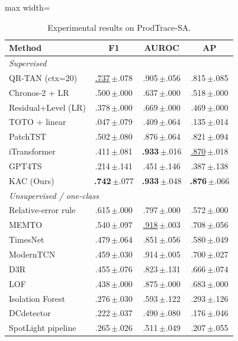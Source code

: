 \documentclass[conference]{IEEEtran}
\newcommand{\sd}[1]{\,{\fontsize{6pt}{7pt}\selectfont $\pm$#1}}
\begin{document}
\begin{table}[!htbp]
  \centering
  \caption{Experimental results on ProdTrace-SA.}
  \label{tab:production_benchmark}
  \small
  \setlength{\tabcolsep}{6pt}
  \begin{adjustbox}{max width=\columnwidth}
  \begin{tabular}{@{}lccc@{}}
    \toprule
    \textbf{Method} & \textbf{F1} & \textbf{AUROC} & \textbf{AP} \\
    \midrule
    \multicolumn{4}{l}{\emph{Supervised}} \\
    QR-TAN (ctx=20)                      & \underline{.737}\sd{.078} & .905\sd{.056} & .815\sd{.085} \\
    Chronos-2 + LR                       & .500\sd{.000} & .637\sd{.000} & .518\sd{.000} \\
    Residual+Level (LR)                  & .378\sd{.000} & .669\sd{.000} & .469\sd{.000} \\
    TOTO + linear           & .047\sd{.079}  & .409\sd{.064}  & .135\sd{.014} \\
    PatchTST      & .502\sd{.080} & .876\sd{.064} & .821\sd{.094} \\
    iTransformer & .411\sd{.081} & \textbf{.933}\sd{.016} & \underline{.870}\sd{.018} \\
    GPT4TS         & .214\sd{.141} & .451\sd{.146} & .387\sd{.138} \\
    KAC (Ours)                           & \textbf{.742}\sd{.077} & \textbf{.933}\sd{.048} & \textbf{.876}\sd{.066} \\
    \midrule
    \multicolumn{4}{l}{\emph{Unsupervised / one-class}} \\
    Relative-error rule                  & .615\sd{.000} & .797\sd{.000} & .572\sd{.000} \\
    MEMTO           & .540\sd{.097} & \underline{.918}\sd{.003} & .708\sd{.056} \\
    TimesNet       & .479\sd{.064} & .851\sd{.056} & .580\sd{.049} \\
    ModernTCN    & .459\sd{.030} & .914\sd{.005} & .700\sd{.027} \\
    D3R               & .455\sd{.076} & .823\sd{.131} & .666\sd{.074} \\
    LOF                                  & .438\sd{.000} & .875\sd{.000} & .683\sd{.000} \\
    Isolation Forest                     & .276\sd{.030} & .593\sd{.122} & .293\sd{.126} \\
    DCdetector & .222\sd{.037} & .490\sd{.080} & .176\sd{.046} \\
    SpotLight pipeline~\cite{sun2024spotlight} & .265\sd{.026} & .511\sd{.049} & .207\sd{.055} \\
    \bottomrule
  \end{tabular}
  \end{adjustbox}
\end{table}
\end{document}
